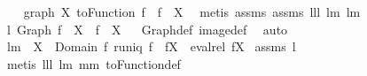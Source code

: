 \begin{isabellebody}
\ \ \isamarkupfalse%
\ {\isachardoublequoteopen}graph\ X\ {\isacharparenleft}toFunction\ f{\isacharparenright}\ {\isacharequal}\ f\ {\isacharbar}{\isacharbar}\ X{\isachardoublequoteclose}\ \isamarkupfalse%
\ {\isacharparenleft}metis\ assms{\isacharparenleft}{}{\isacharparenright}\ assms{\isacharparenleft}{}{\isacharparenright}\ lll{}{}\ lm{}{}{}\ lm{}{}{\isacharparenright}\isanewline
{}\isamarkupfalse%
%
\endisatagproof
{\isafoldproof}%
%
\isadelimproof
\isanewline
%
\endisadelimproof
\isanewline
{}\isamarkupfalse%
\ l{}{\isacharcolon}\ {\isachardoublequoteopen}{\isacharparenleft}Graph\ f{\isacharparenright}\ {\isacharbackquote}{\isacharbackquote}\ X\ {\isacharequal}\ f\ {\isacharbackquote}\ X{\isachardoublequoteclose}%
\isadelimproof
\ %
\endisadelimproof
%
\isatagproof
{}\isamarkupfalse%
\ Graph{\isacharunderscore}def\ image{\isacharunderscore}def\ \isamarkupfalse%
\ auto%
\endisatagproof
{\isafoldproof}%
%
\isadelimproof
%
\endisadelimproof
\isanewline
\isanewline
{}\isamarkupfalse%
\ lm{}{}{}{\isacharcolon}\ \ {\isachardoublequoteopen}X\ {\isasymsubseteq}\ Domain\ f{\isachardoublequoteclose}\ {\isachardoublequoteopen}runiq\ f{\isachardoublequoteclose}\ \ {\isachardoublequoteopen}f{\isacharbackquote}{\isacharbackquote}X\ {\isacharequal}\ {\isacharparenleft}eval{\isacharunderscore}rel\ f{\isacharparenright}{\isacharbackquote}X{\isachardoublequoteclose}\isanewline
%
\isadelimproof
%
\endisadelimproof
%
\isatagproof
{}\isamarkupfalse%
\ assms\ l{}\ \isamarkupfalse%
\ {\isacharparenleft}metis\ lll{}{}\ lm{}{}\ mm{}{}\ toFunction{\isacharunderscore}def{\isacharparenright}%
\endisatagproof
{\isafoldproof}%
%
\isadelimproof
\isanewline
%
\endisadelimproof
%
\isadelimtheory
\isanewline
%
\endisadelimtheory
%
\isatagtheory
{}\isamarkupfalse%
%
\endisatagtheory
{\isafoldtheory}%
%
\isadelimtheory
%
\endisadelimtheory
\end{isabellebody}%
